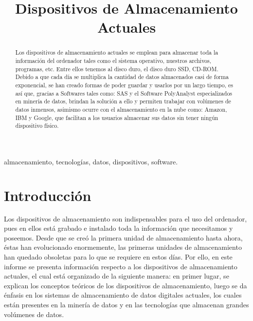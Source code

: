 \documentclass[10pt,journal]{IEEEtran}
\begin{document}
\title{Dispositivos de Almacenamiento Actuales\\}
\author{
}
\maketitle
\begin{abstract}
Los dispositivos de almacenamiento actuales se emplean para almacenar toda la información del ordenador tales como el sistema operativo, nuestros archivos, programas, etc. Entre ellos tenemos al disco duro, el disco duro SSD, CD-ROM. Debido a que cada día se multiplica la cantidad de datos almacenados casi de forma exponencial, se han creado formas de poder guardar y usarlos por un largo tiempo, es así que, gracias a Softwares tales como: SAS y el Software PolyAnalyst especializados en minería de datos, brindan la solución a ello y permiten trabajar con volúmenes de datos inmensos, asimismo ocurre con el almacenamiento en la nube como: Amazon, IBM y Google, que facilitan a los usuarios almacenar sus datos sin tener ningún dispositivo físico. 
\end{abstract}

\begin{IEEEkeywords}
almacenamiento, tecnologías, datos, dispositivos, software.
\end{IEEEkeywords}

\section{\textbf{Introducción}}
Los dispositivos de almacenamiento son indispensables para el uso del ordenador, pues en ellos está grabado e instalado toda la información que necesitamos y poseemos. Desde que se creó la primera unidad de almacenamiento hasta ahora, éstas han evolucionado enormemente, las primeras unidades de almacenamiento han quedado obsoletas para lo que se requiere en estos días. Por ello, en este informe se presenta información respecto a los dispositivos de almacenamiento actuales, el cual está organizado de la siguiente manera: en primer lugar, se explican los conceptos teóricos de los dispositivos de almacenamiento, luego se da énfasis en los sistemas de almacenamiento de datos digitales actuales, los cuales están presentes en la minería de datos y en las tecnologías que almacenan grandes volúmenes de datos.
\end{document}
